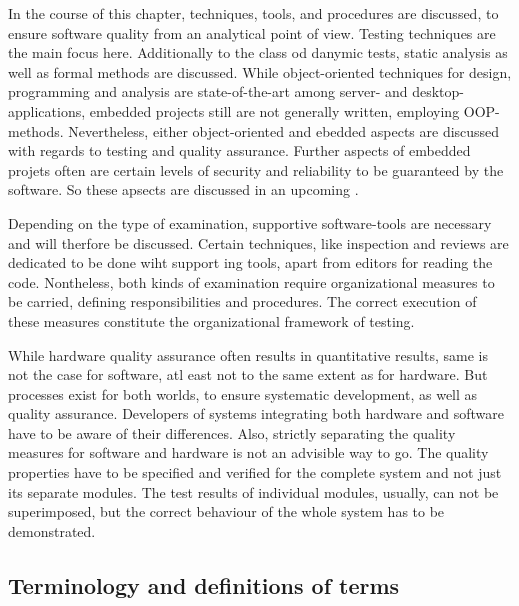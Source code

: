 In the course of this chapter, techniques, tools, and procedures are discussed, to ensure software quality from an analytical point of view. Testing techniques are the main focus here. Additionally to the class od danymic tests, static analysis as well as formal methods are discussed. While object-oriented techniques for design, programming and analysis are state-of-the-art among server- and desktop-applications, embedded projects still are not generally written, employing OOP-methods. Nevertheless, either object-oriented and ebedded aspects are discussed with regards to testing and quality assurance. Further aspects of embedded projets often are certain levels of security and reliability to be guaranteed by the software. So these apsects are discussed in an upcoming .

Depending on the type of examination, supportive software-tools are necessary and will therfore be discussed. Certain techniques, like inspection and reviews are dedicated to be done wiht support ing tools, apart from editors for reading the code. Nontheless, both kinds of examination require organizational measures to be carried, defining responsibilities and procedures. The correct execution of these measures constitute the organizational framework of testing.

While hardware quality assurance often results in quantitative results, same is not the case for software, atl east not to the same extent as for hardware. But processes exist for both worlds, to ensure systematic development, as well as quality assurance. Developers of systems integrating both hardware and software have to be aware of their differences. Also, strictly separating the quality measures for software and hardware is not an advisible way to go. The quality properties have to be specified and verified for the complete system and not just its separate modules. The test results of individual modules, usually, can not be superimposed, but the correct behaviour of the whole system has to be demonstrated. 
	
	\subsection{Terminology and definitions of terms}
